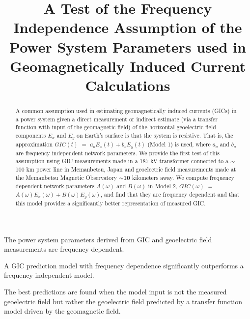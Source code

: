 \documentclass[draft,linenumbers]{agujournal2018}
\begin{document}

\title{A Test of the Frequency Independence Assumption of the Power System Parameters used in Geomagnetically Induced Current Calculations}





\begin{keypoints}
\item The power system parameters derived from GIC and geoelectric field measurements are frequency dependent.
\item A GIC prediction model with frequency dependence significantly outperforms a frequency independent model.
\item The best predictions are found when the model input is not the measured geoelectric field but rather the geoelectric field predicted by a transfer function model driven by the geomagnetic field.
\end{keypoints}

\begin{abstract}
A common assumption used in estimating geomagnetically induced currents (GICs) in a power system given a direct measurement or indirect estimate (via a transfer function with input of the geomagnetic field) of the horizontal geoelectric field components $E_x$ and $E_y$ on Earth's surface is that the system is resistive. That is, the approximation $GIC(t)$  $=$ $a_oE_x(t) + b_oE_y(t)$ (Model 1) is used, where $a_o$ and $b_o$ are frequency independent network parameters.  We provide the first test of this assumption using GIC measurements made in a 187 kV transformer connected to a $\sim$100 km power line in Memanbetsu, Japan and geoelectric field measurements made at the Memanbetsu Magnetic Observatory  $\sim${\color{red}\textbf{10}} kilometers away. We compute frequency dependent network parameters  $A(\omega)$ and $B(\omega)$ in Model 2, $GIC(\omega)$ $=$ $A(\omega)E_x(\omega) + B(\omega)E_y(\omega)$, and find that they are frequency dependent and that this model provides a significantly better representation of measured GIC.
\end{abstract}
\end{document}
